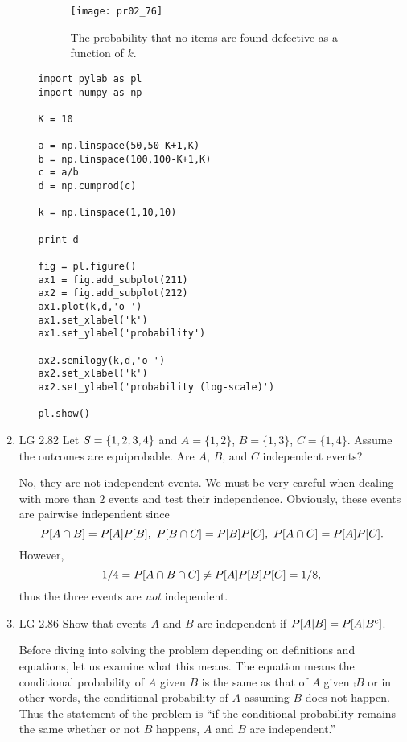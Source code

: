 \begin{enumerate}
\begin{enumerate}
\begin{solution}
			\begin{figure}
			\begin{center}
			\texttt{[image: pr02\_76]}
			\caption{
			The probability that no items are found defective as
			a function of $k$.}
			\label{fig-prob-2-76}
			\end{center}
			\end{figure}

			\begin{verbatim}
import pylab as pl
import numpy as np

K = 10

a = np.linspace(50,50-K+1,K)
b = np.linspace(100,100-K+1,K)
c = a/b
d = np.cumprod(c)

k = np.linspace(1,10,10)

print d

fig = pl.figure()
ax1 = fig.add_subplot(211)
ax2 = fig.add_subplot(212)
ax1.plot(k,d,'o-')
ax1.set_xlabel('k')
ax1.set_ylabel('probability')

ax2.semilogy(k,d,'o-')
ax2.set_xlabel('k')
ax2.set_ylabel('probability (log-scale)')

pl.show()
			\end{verbatim}



		\end{solution}
	\end{enumerate}
	\fi

	\item LG 2.82
	\ifdefined\sol
	Let $S = \{1, 2, 3, 4\}$
	and $A = \{1, 2\}$, $ B = \{1, 3\}$, $ C = \{1, 4\}$.
	Assume the outcomes are equiprobable. Are $A$, $B$, and $C$ independent events?
	\begin{solution}
		No, they are not independent events.
		We must be very careful when dealing with more than $2$ events
		and test their independence.
		Obviously, these events are pairwise independent
		since
		\[
			P[A\cap B] = P[A] P[B],\
			P[B\cap C] = P[B] P[C],\
			P[A\cap C] = P[A] P[C].
		\]
		However,
		\[
			1/4 = P[A\cap B\cap C] \ne P[A]P[B] P[C] = 1/8,
		\]
		thus the three events are \emph{not} independent.
	\end{solution}
	\fi

	\item LG 2.86
	\ifdefined\sol
	Show that events $A$ and $B$ are independent if $P[A|B] = P[A|{B}^c]$.
	\begin{solution}
		Before diving into solving the problem depending on definitions and equations,
		let us examine what this means.
		The equation means the conditional probability of $A$ given $B$
		is the same as that of $A$ given $\comp{B}$
		or in other words, the conditional probability of $A$
		assuming $B$ does not happen.
		Thus the statement of the problem
		is ``if the conditional probability remains the same
		whether or not $B$ happens,
		$A$ and $B$ are independent.''



\end{solution}
\end{enumerate}

